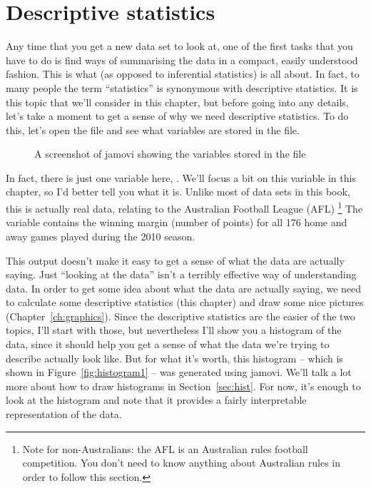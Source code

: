 
\chapter{Descriptive statistics\label{ch:descriptives}}


Any time that you get a new data set to look at, one of the first tasks that you have to do is find ways of summarising the data in a compact, easily understood fashion. This is what  (as opposed to inferential statistics) is all about. In fact, to many people the term ``statistics'' is synonymous with descriptive statistics. It is this topic that we'll consider in this chapter, but before going into any details, let's take a moment to get a sense of why we need descriptive statistics. To do this, let's open the  file and see what variables are stored in the file.

\vspace*{1cm}
\begin{figure}[h]
\begin{center}
\caption{A screenshot of jamovi showing the variables stored in the  file}
\label{fig:aflsmall}
\HR
\end{center}
\end{figure}

In fact, there is just one variable here, . We'll focus a bit on this variable in this chapter, so I'd better tell you what it is. Unlike most of data sets in this book, this is actually real data, relating to the Australian Football League (AFL) \footnote{Note for non-Australians: the AFL is an Australian rules football competition. You don't need to know anything about Australian rules in order to follow this section.} The  variable contains the winning margin (number of points) for all 176 home and away games played during the 2010 season. 

This output doesn't make it easy to get a sense of what the data are actually saying. Just ``looking at the data'' isn't a terribly effective way of understanding data. In order to get some idea about what the data are actually saying, we need to calculate some descriptive statistics (this chapter) and draw some nice pictures (Chapter~\ref{ch:graphics}). Since the descriptive statistics are the easier of the two topics, I'll start with those, but nevertheless I'll show you a histogram of the  data, since it should help you get a sense of what the data we're trying to describe actually look like. But for what it's worth, this histogram -- which is shown in Figure~\ref{fig:histogram1} -- was generated using jamovi. We'll talk a lot more about how to draw histograms in Section~\ref{sec:hist}. For now, it's enough to look at the histogram and note that it provides a fairly interpretable representation of the  data.

